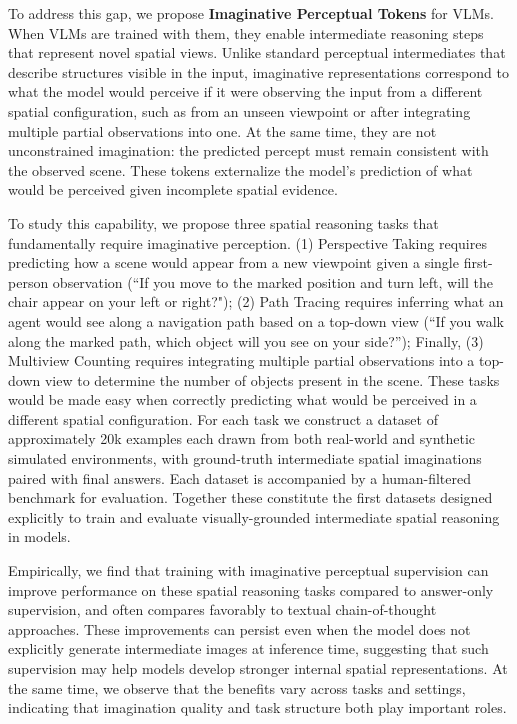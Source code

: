 \documentclass{llmxive}
\begin{document}
To address this gap, we propose \textbf{Imaginative Perceptual Tokens} for VLMs. When VLMs are trained with them, they enable intermediate reasoning steps that represent novel spatial views. Unlike standard perceptual intermediates that describe structures visible in the input, imaginative representations correspond to what the model would perceive if it were observing the input from a different spatial configuration, such as from an unseen viewpoint or after integrating multiple partial observations into one. At the same time, they are not unconstrained imagination: the predicted percept must remain consistent with the observed scene. These tokens externalize the model's prediction of what would be perceived given incomplete spatial evidence. %


To study this capability, we propose three spatial reasoning tasks that fundamentally require imaginative perception. (1) Perspective Taking requires predicting how a scene would appear from a new viewpoint given a single first-person observation (“If you move to the marked position and turn left, will the chair appear on your left or right?"); (2) Path Tracing requires inferring what an agent would see along a navigation path based on a top-down view (“If you walk along the marked path, which object will you see on your side?”); Finally, (3) Multiview Counting requires integrating multiple partial observations into a top-down view to determine the number of objects present in the scene. These tasks would be made easy when correctly predicting what would be perceived in a different spatial configuration. 
For each task we construct a dataset of approximately 20k examples each drawn from both real-world and synthetic simulated environments, with ground-truth intermediate spatial imaginations paired with final answers. Each dataset is accompanied by a human-filtered benchmark for evaluation. Together these constitute the first datasets designed explicitly to train and evaluate visually-grounded intermediate spatial reasoning in models.

Empirically, we find that training with imaginative perceptual supervision can improve performance on these spatial reasoning tasks compared to answer-only supervision, and often compares favorably to textual chain-of-thought approaches. These improvements can persist even when the model does not explicitly generate intermediate images at inference time, suggesting that such supervision may help models develop stronger internal spatial representations. At the same time, we observe that the benefits vary across tasks and settings, indicating that imagination quality and task structure both play important roles.
\end{document}
